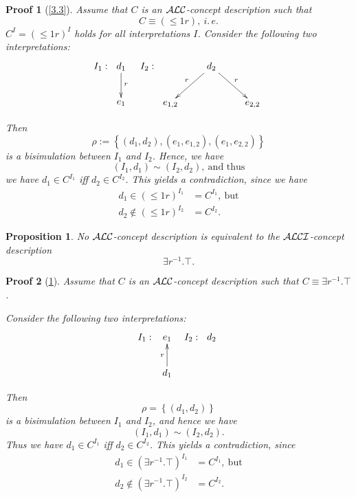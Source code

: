 \documentclass[openany]{scrbook}
\theoremstyle{break}
\newtheorem{Proposition}[Theorem]{Proposition}
\theoremstyle{nonumberbreak}
\theoremstyle{nonumberplain}
\theoremstyle{nonumberbreak}
\newtheorem{Proof}{Proof}
\newcommand{\set}[1]{\left\{#1\right\}}
\newcommand{\ie}{i{.}\,e{.}\xspace}
\newcommand{\ALC}{{\cal A}{\cal L}{\cal C}}
\newcommand{\ALCI}{{\cal A}{\cal L}{\cal C}{\cal I}}
\begin{document}
\begin{Proof}[\cref{3.3}]
  Assume that $C$ is an $\ALC$-concept description such that
  \begin{equation*}
    C \equiv (\leq 1 r),\ \ie
  \end{equation*}
  $C^I = (\leq 1r)^I$ holds for all interpretations $I$. Consider the
  following two interpretations:
  \begin{align*}
    I_1:\ \xymatrix{d_1 \ar[d]^r \\ e_1} && I_2:\
    \xymatrix{& d_2 \ar[ld]_{r} \ar[rd]^{r} \\
    e_{1,2} && e_{2,2}}
  \end{align*}

  Then
  \begin{equation*}
    \rho := \set{(d_1, d_2), (e_1, e_{1, 2}), (e_1, e_{2, 2})}
  \end{equation*}
  is a bisimulation between $I_1$ and $I_2$. Hence, we have
  \begin{equation*}
    (I_1, d_1) \sim (I_2, d_2),\ \text{and thus}
  \end{equation*}
  we have $d_1 \in C^{I_1}$ iff $d_2 \in C^{I_2}$. This yields a
  contradiction, since we have
  \begin{align*}
    d_1 \in (\leq 1 r)^{I_1} & = C^{I_1},\ \text{but} \\
    d_2 \not\in (\leq 1 r)^{I_2} & = C^{I_2}.
  \end{align*}
\end{Proof}

\begin{Proposition}
  \label{3.4}
  No $\ALC$-concept description is equivalent to the $\ALCI$-concept
  description
  \begin{equation*}
    \exists r^{-1}.\top.
  \end{equation*}
\end{Proposition}

\begin{Proof}[\cref{3.4}]
  Assume that $C$ is an $\ALC$-concept description such that $C \equiv
  \exists r^{-1}.\top$.

  Consider the following two interpretations:
  \begin{align*}
    I_1:\ \xymatrix{e_1 \\ \ar[u]^r d_1} && I_2:\
    \xymatrix{d_2}
  \end{align*}

  Then
  \begin{equation*}
    \rho = \set{(d_1, d_2)}
  \end{equation*}
  is a bisimulation between $I_1$ and $I_2$, and hence we have
  \begin{equation*}
    (I_1, d_1) \sim (I_2, d_2).
  \end{equation*}
  Thus we have $d_1 \in C^{I_1}$ iff $d_2 \in C^{I_2}$. This yields a
  contradiction, since
  \begin{align*}
    d_1 \in (\exists r^{-1}. \top)^{I_1} & = C^{I_1},\ \text{but} \\
    d_2 \not\in (\exists r^{-1}. \top)^{I_2} & = C^{I_2}.
  \end{align*}
\end{Proof}
\end{document}
